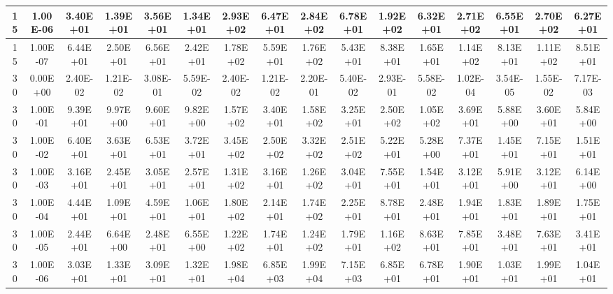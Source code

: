 \begin{table}[H]
\begin{center}
{\begin{tabular}{|c|c|c|c|c|c|c|c|c|c|c|c|c|c|c|c|}
15    &    1.00E-06    &    3.40E+01    &    1.39E+01    &    3.56E+01    &    1.34E+01    &    2.93E+02    &    6.47E+01    &    2.84E+02    &    6.78E+01    &    1.92E+02    &    6.32E+01    &    2.71E+02    &    6.55E+01    &    2.70E+02    &    6.27E+01    \\ \hline
15    &    1.00E-07    &    6.44E+01    &    2.50E+01    &    6.56E+01    &    2.42E+01    &    1.78E+02    &    5.59E+01    &    1.76E+02    &    5.43E+01    &    8.38E+01    &    1.65E+01    &    1.14E+02    &    8.13E+01    &    1.11E+02    &    8.51E+01    \\ \hline
30    &    0.00E+00    &    2.40E-02    &    1.21E-02    &    3.08E-01    &    5.59E-02    &    2.40E-02    &    1.21E-02    &    2.20E-01    &    5.40E-02    &    2.93E-01    &    5.58E-02    &    1.02E-04    &    3.54E-05    &    1.55E-02    &    7.17E-03    \\ \hline
30    &    1.00E-01    &    9.39E+01    &    9.97E+00    &    9.60E+01    &    9.82E+00    &    1.57E+02    &    3.40E+01    &    1.58E+02    &    3.25E+01    &    2.50E+02    &    1.05E+02    &    3.69E+01    &    5.88E+00    &    3.60E+01    &    5.84E+00    \\ \hline
30    &    1.00E-02    &    6.40E+01    &    3.63E+01    &    6.53E+01    &    3.72E+01    &    3.45E+02    &    2.50E+02    &    3.32E+02    &    2.51E+02    &    5.22E+01    &    5.28E+00    &    7.37E+01    &    1.45E+01    &    7.15E+01    &    1.51E+01    \\ \hline
30    &    1.00E-03    &    3.16E+01    &    2.45E+01    &    3.05E+01    &    2.57E+01    &    1.31E+02    &    3.16E+01    &    1.26E+02    &    3.04E+01    &    7.55E+01    &    1.54E+01    &    3.12E+01    &    5.91E+00    &    3.12E+01    &    6.14E+00    \\ \hline
30    &    1.00E-04    &    4.44E+01    &    1.09E+01    &    4.59E+01    &    1.06E+01    &    1.80E+02    &    2.14E+01    &    1.74E+02    &    2.25E+01    &    8.78E+01    &    2.48E+01    &    1.94E+01    &    1.83E+01    &    1.89E+01    &    1.75E+01    \\ \hline
30    &    1.00E-05    &    2.44E+01    &    6.64E+00    &    2.48E+01    &    6.55E+00    &    1.22E+02    &    1.74E+01    &    1.24E+02    &    1.79E+01    &    1.16E+02    &    8.63E+01    &    7.85E+01    &    3.48E+01    &    7.63E+01    &    3.41E+01    \\ \hline
30    &    1.00E-06    &    3.03E+01    &    1.33E+01    &    3.09E+01    &    1.32E+01    &    1.98E+04    &    6.85E+03    &    1.99E+04    &    7.15E+03    &    6.85E+01    &    6.78E+01    &    1.90E+01    &    1.03E+01    &    1.99E+01    &    1.04E+01    \\ \hline

\end{tabular}}
\end{center}
\end{table}
